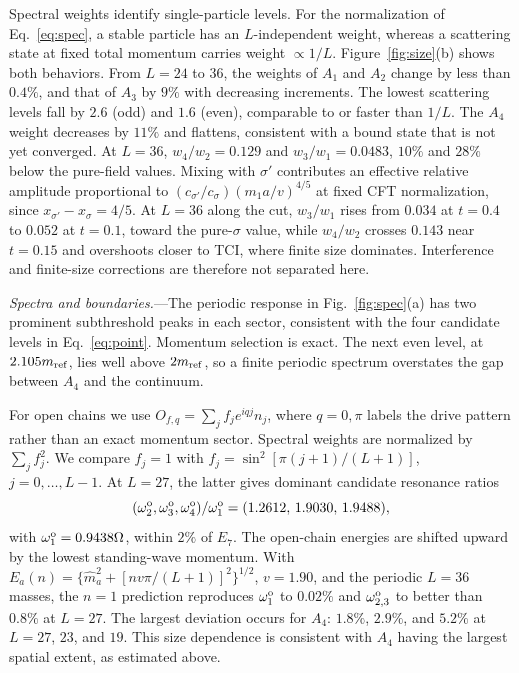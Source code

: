 \documentclass[aps,prl,twocolumn,superscriptaddress,showpacs,floatfix,10pt]{revtex4-2}
\begin{document}
Spectral weights identify single-particle levels. For the normalization of
Eq.~\eqref{eq:spec}, a stable particle has an $L$-independent weight, whereas a
scattering state at fixed total momentum carries weight $\propto1/L$.
Figure~\ref{fig:size}(b) shows both behaviors. From $L=24$ to $36$, the weights
of $A_1$ and $A_2$ change by less than $0.4\%$, and that of $A_3$ by $9\%$
with decreasing increments. The lowest scattering levels fall by $2.6$ (odd) and $1.6$ (even),
comparable to or faster than $1/L$. The $A_4$ weight decreases by $11\%$ and
flattens, consistent with a bound state that is not yet converged.
At $L=36$, $w_4/w_2=0.129$ and $w_3/w_1=0.0483$,
$10\%$ and $28\%$ below the pure-field values. Mixing with $\sigma'$ contributes an effective relative
amplitude proportional to $(c_{\sigma'}/c_\sigma)(m_1a/v)^{4/5}$ at fixed CFT
normalization, since $x_{\sigma'}-x_\sigma=4/5$. At $L=36$ along the cut, $w_3/w_1$ rises from $0.034$ at $t=0.4$ to
$0.052$ at $t=0.1$, toward the pure-$\sigma$ value, while $w_4/w_2$ crosses
$0.143$ near $t=0.15$ and overshoots closer to TCI, where finite size dominates.
Interference and finite-size corrections are therefore not separated here.

\emph{Spectra and boundaries.}---The periodic response in
Fig.~\ref{fig:spec}(a) has two prominent subthreshold peaks in each sector,
consistent with the four candidate levels in Eq.~\eqref{eq:point}.
Momentum selection is exact. The next even level, at $2.105m_{\rm ref}$, lies
well above $2m_{\rm ref}$, so a finite periodic spectrum overstates the gap
between $A_4$ and the continuum.

For open chains we use $O_{f,q}=\sum_j f_j e^{iqj}n_j$, where $q=0,\pi$ labels
the drive pattern rather than an exact momentum sector. Spectral weights are
normalized by $\sum_j f_j^2$. We compare $f_j=1$ with
$f_j=\sin^2[\pi(j+1)/(L+1)]$, $j=0,\ldots,L-1$.
At $L=27$, the latter gives dominant candidate resonance ratios
\begin{equation}
 (\omega_2^{\rm o},\omega_3^{\rm o},\omega_4^{\rm o})/\omega_1^{\rm o}
 =(1.2612,\,1.9030,\,1.9488),
 \label{eq:open}
\end{equation}
with $\omega_1^{\rm o}=0.9438\Omega$, within $2\%$ of $E_7$. The open-chain
energies are shifted upward by the lowest standing-wave momentum. With
$E_a(n)=\{\widehat m_a^2+[n v\pi/(L+1)]^2\}^{1/2}$, $v=1.90$, and the periodic
$L=36$ masses, the $n=1$ prediction reproduces $\omega_1^{\rm o}$ to $0.02\%$
and $\omega_{2,3}^{\rm o}$ to better than $0.8\%$ at $L=27$. The largest
deviation occurs for $A_4$: $1.8\%$, $2.9\%$, and $5.2\%$ at $L=27$, $23$, and
$19$. This size dependence is consistent with $A_4$ having the largest spatial
extent, as estimated above.
\end{document}
